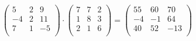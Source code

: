 \documentclass[10pt]{article}
\begin{document}
\begin{center}

$
\begin{pmatrix}
5 & 2 & 9 \\
-4 & 2 & 11 \\
7 & 1 & -5 \\
\end{pmatrix}  \cdot 
\begin{pmatrix}
7 & 7 & 2 \\
1 & 8 & 3 \\
2 & 1 & 6 \\
\end{pmatrix}
=
\begin{pmatrix}
55 & 60 & 70 \\
-4 & -1 & 64 \\
40 & 52 & -13 \\
\end{pmatrix}
$
\end{center}
\end{document}
